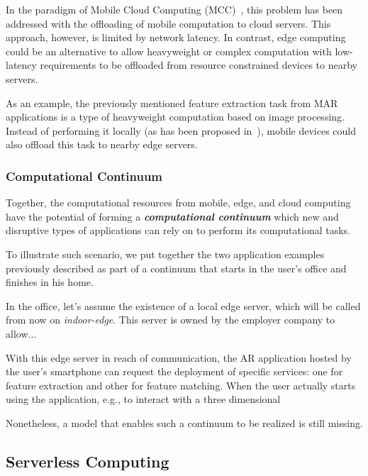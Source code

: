 In the paradigm of Mobile Cloud Computing (MCC)~\cite{}, this problem has been addressed with the offloading of mobile computation to cloud servers. This approach, however, is limited by network latency. In contrast, edge computing could be an alternative to allow heavyweight or complex computation with low-latency requirements to be offloaded from resource constrained devices to nearby servers.


As an example, the previously mentioned feature extraction task from MAR applications is a type of heavyweight computation based on image processing. Instead of performing it locally (as has been proposed in~\cite{}), mobile devices could also offload this task to nearby edge servers. 

\subsubsection{Computational Continuum}

Together, the computational resources from mobile, edge, and cloud computing have the potential of forming a \textit{\textbf{computational continuum}} which new and disruptive types of applications can rely on to perform its computational tasks. 

To illustrate such scenario, we put together the two application examples previously described as part of a continuum that starts in the user's office and finishes in his home. 

In the office, let's assume the existence of a local edge server, which will be called from now on \textit{indoor-edge}. This server is owned by the employer company to allow...

With this edge server in reach of communication, the AR application hosted by the user's smartphone can request the deployment of specific services: one for feature extraction and other for feature matching. When the user actually starts using the application, e.g., to interact with a three dimensional 


 Nonetheless, a model that enables such a continuum to be realized is still missing.

\subsection{Serverless Computing}

